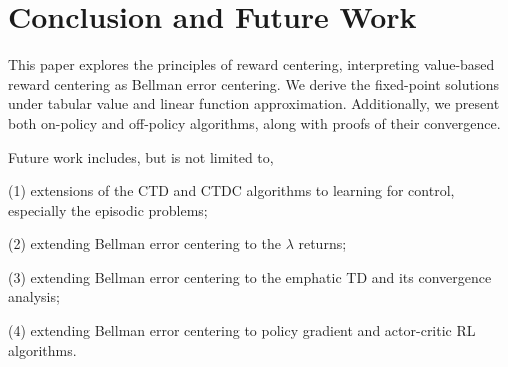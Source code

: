 \section{Conclusion and Future Work}
This paper explores the principles of reward centering, interpreting value-based
reward centering as Bellman error centering. We derive the fixed-point solutions
under tabular value and linear function approximation. Additionally, we present
both on-policy and off-policy algorithms, along with proofs of their
convergence.


Future work includes, but is not limited to,

(1) extensions of the CTD and CTDC algorithms to learning for control, 
especially the episodic problems;

(2) extending Bellman error centering to the $\lambda$ returns;

(3) extending Bellman error centering to the emphatic TD \cite{sutton2016emphatic}
and its convergence analysis;

(4) extending Bellman error centering to policy gradient and actor-critic RL algorithms.


